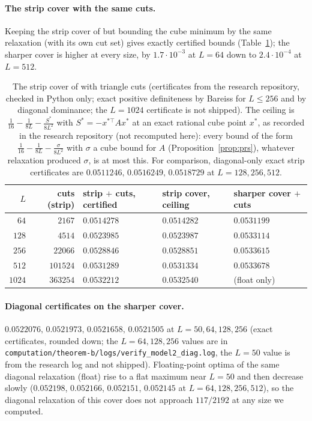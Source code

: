 \documentclass[11pt]{amsart}
\theoremstyle{remark}
\begin{document}
\paragraph{The strip cover with the same cuts.}
Keeping the strip cover of \cite{PRS08} but bounding the cube minimum by the same relaxation (with its own cut set) gives exactly certified bounds (Table~\ref{tab:stripcuts}); the sharper cover is higher at every size, by $1.7\cdot10^{-3}$ at $L=64$ down to $2.4\cdot10^{-4}$ at $L=512$.
\begin{table}[h]
\centering\small
\begin{tabular}{rrlll}
\toprule
$L$ & cuts (strip) & strip $+$ cuts, certified & strip cover, ceiling & sharper cover $+$ cuts\\
\midrule
$64$ & $2167$ & $0.0514278$ & $0.0514282$ & $0.0531199$\\
$128$ & $4514$ & $0.0523985$ & $0.0523987$ & $0.0533114$\\
$256$ & $22066$ & $0.0528846$ & $0.0528851$ & $0.0533615$\\
$512$ & $101524$ & $0.0531289$ & $0.0531334$ & $0.0533678$\\
$1024$ & $363254$ & $0.0532212$ & $0.0532540$ & (float only)\\
\bottomrule
\end{tabular}
\caption{The strip cover of \cite{PRS08} with triangle cuts (certificates from the research repository, checked in Python only; exact positive definiteness by Bareiss for $L\le256$ and by diagonal dominance; the $L=1024$ certificate is not shipped). The ceiling is $\frac1{16}-\frac1{8L}-\frac{S^*}{8L^2}$ with $S^*=-x^{*\top}Ax^*$ at an exact rational cube point $x^*$, as recorded in the research repository (not recomputed here): every bound of the form $\frac1{16}-\frac1{8L}-\frac{\sigma}{8L^2}$ with $\sigma$ a cube bound for $A$ (Proposition~\ref{prop:prs}), whatever relaxation produced $\sigma$, is at most this. For comparison, diagonal-only exact strip certificates are $0.0511246,\,0.0516249,\,0.0518729$ at $L=128,256,512$.}\label{tab:stripcuts}
\end{table}

\paragraph{Diagonal certificates on the sharper cover.}
$0.0522076,\,0.0521973,\,0.0521658,\,0.0521505$ at $L=50,64,128,256$ (exact certificates, rounded down; the $L=64,128,256$ values are in \texttt{computation/theorem-b/logs/verify\_model2\_diag.log}, the $L=50$ value is from the research log and not shipped). Floating-point optima of the same diagonal relaxation (float) rise to a flat maximum near $L=50$ and then decrease slowly ($0.052198$, $0.052166$, $0.052151$, $0.052145$ at $L=64,128,256,512$), so the diagonal relaxation of this cover does not approach $117/2192$ at any size we computed.
\end{document}
